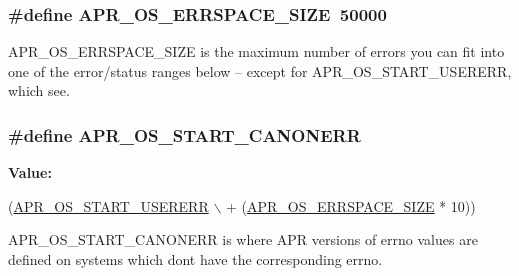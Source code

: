 \subsubsection[{\texorpdfstring{A\+P\+R\+\_\+\+O\+S\+\_\+\+E\+R\+R\+S\+P\+A\+C\+E\+\_\+\+S\+I\+ZE}{APR_OS_ERRSPACE_SIZE}}]{\setlength{\rightskip}{0pt plus 5cm}\#define A\+P\+R\+\_\+\+O\+S\+\_\+\+E\+R\+R\+S\+P\+A\+C\+E\+\_\+\+S\+I\+ZE~50000}\hypertarget{group__apr__errno_gadb8d97e6836ccdc57b43b6119a5acccf}{}\label{group__apr__errno_gadb8d97e6836ccdc57b43b6119a5acccf}
A\+P\+R\+\_\+\+O\+S\+\_\+\+E\+R\+R\+S\+P\+A\+C\+E\+\_\+\+S\+I\+ZE is the maximum number of errors you can fit into one of the error/status ranges below -- except for A\+P\+R\+\_\+\+O\+S\+\_\+\+S\+T\+A\+R\+T\+\_\+\+U\+S\+E\+R\+E\+RR, which see. 
\subsubsection[{\texorpdfstring{A\+P\+R\+\_\+\+O\+S\+\_\+\+S\+T\+A\+R\+T\+\_\+\+C\+A\+N\+O\+N\+E\+RR}{APR_OS_START_CANONERR}}]{\setlength{\rightskip}{0pt plus 5cm}\#define A\+P\+R\+\_\+\+O\+S\+\_\+\+S\+T\+A\+R\+T\+\_\+\+C\+A\+N\+O\+N\+E\+RR}\hypertarget{group__apr__errno_ga7bca957c11b80b31cb54b0d2cbe9e025}{}\label{group__apr__errno_ga7bca957c11b80b31cb54b0d2cbe9e025}
{\bfseries Value\+:}
\begin{DoxyCode}
(\hyperlink{group__apr__errno_gacd35b2de1e38a1fa4717e38d5e153571}{APR\_OS\_START\_USERERR} \(\backslash\)
                                 + (\hyperlink{group__apr__errno_gadb8d97e6836ccdc57b43b6119a5acccf}{APR\_OS\_ERRSPACE\_SIZE} * 10))
\end{DoxyCode}
A\+P\+R\+\_\+\+O\+S\+\_\+\+S\+T\+A\+R\+T\+\_\+\+C\+A\+N\+O\+N\+E\+RR is where A\+PR versions of errno values are defined on systems which don\textquotesingle{}t have the corresponding errno. 
